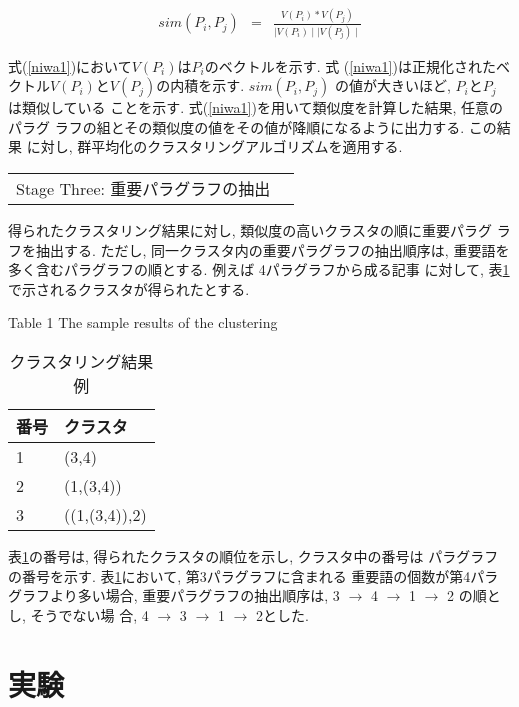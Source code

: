 \begin{eqnarray}
sim(P_{i},P_{j}) & = & \frac{V(P_{i}) \ast V(P_{j})}{\mid V(P_{i}) \mid \mid V(P_{j}) \mid}  \label{niwa1}
\end{eqnarray}

\noindent
式(\ref{niwa1})において$V(P_{i})$は$P_{i}$のベクトルを示す.  式
(\ref{niwa1})は正規化されたベクトル$V(P_{i})$と$V(P_{j})$の内積を示す.
$sim(P_{i}, P_{j})$ の値が大きいほど, $P_{i}$と$P_{j}$ は類似している
ことを示す.  式(\ref{niwa1})を用いて類似度を計算した結果, 任意のパラグ
ラフの組とその類似度の値をその値が降順になるように出力する.  この結果
に対し, 群平均化のクラスタリングアルゴリズムを適用する.

\begin{tabular}{ll}
\sf Stage Three: 重要パラグラフの抽出
\end{tabular}

得られたクラスタリング結果に対し, 類似度の高いクラスタの順に重要パラグ
ラフを抽出する.  ただし, 同一クラスタ内の重要パラグラフの抽出順序は, 
重要語を多く含むパラグラフの順とする.  例えば 4パラグラフから成る記事
に対して, 表\ref{para}で示されるクラスタが得られたとする.

{\footnotesize
\begin{table}[htbp]
\begin{center}
\caption{クラスタリング結果例}  \label{para}
\vspace*{-3mm}
Table 1 The sample results of the clustering \\
\begin{tabular}{ll} \hline \hline
番号 &クラスタ \\ \hline
1 &(3,4) \\
2 &(1,(3,4)) \\
3 &((1,(3,4)),2) \\ \hline
\end{tabular}
\end{center}
\end{table}
}

\noindent
表\ref{para}の番号は, 得られたクラスタの順位を示し, クラスタ中の番号は
パラグラフの番号を示す.  表\ref{para}において, 第3パラグラフに含まれる
重要語の個数が第4パラグラフより多い場合, 重要パラグラフの抽出順序は, 3
$\rightarrow$ 4 $\rightarrow$ 1 $\rightarrow$ 2 の順とし, そうでない場
合, 4 $\rightarrow$ 3 $\rightarrow$ 1 $\rightarrow$ 2とした.

\section{実験}

